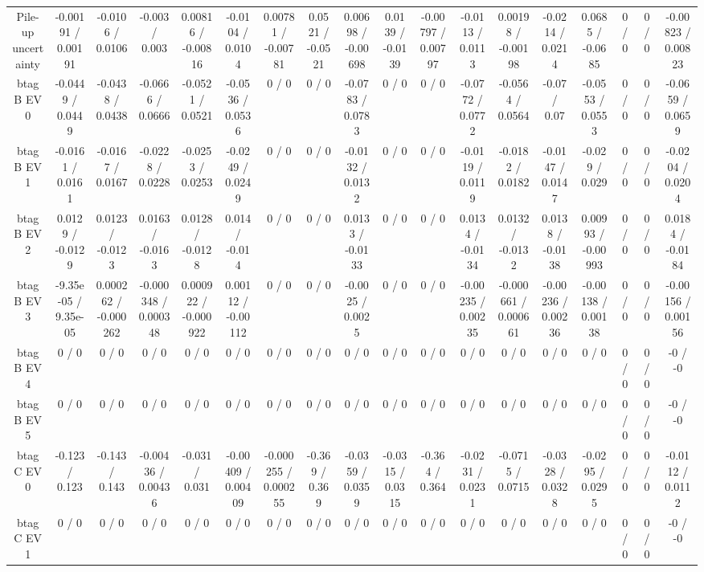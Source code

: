 \documentclass[10pt]{article}
\begin{document}
\begin{table}[htbp]
\begin{center}
\begin{tabular}{|c|c|c|c|c|c|c|c|c|c|c|c|c|c|c|c|c|c|}
  Pile-up uncertainty & -0.00191 / 0.00191 & -0.0106 / 0.0106 & -0.003 / 0.003 & 0.00816 / -0.00816 & -0.0104 / 0.0104 & 0.00781 / -0.00781 & 0.0521 / -0.0521 & 0.00698 / -0.00698 & 0.0139 / -0.0139 & -0.00797 / 0.00797 & -0.0113 / 0.0113 & 0.00198 / -0.00198 & -0.0214 / 0.0214 & 0.0685 / -0.0685 & 0 / 0 & 0 / 0 & -0.00823 / 0.00823 \\ 
  btag B EV 0 & -0.0449 / 0.0449 & -0.0438 / 0.0438 & -0.0666 / 0.0666 & -0.0521 / 0.0521 & -0.0536 / 0.0536 & 0 / 0 & 0 / 0 & -0.0783 / 0.0783 & 0 / 0 & 0 / 0 & -0.0772 / 0.0772 & -0.0564 / 0.0564 & -0.07 / 0.07 & -0.0553 / 0.0553 & 0 / 0 & 0 / 0 & -0.0659 / 0.0659 \\ 
  btag B EV 1 & -0.0161 / 0.0161 & -0.0167 / 0.0167 & -0.0228 / 0.0228 & -0.0253 / 0.0253 & -0.0249 / 0.0249 & 0 / 0 & 0 / 0 & -0.0132 / 0.0132 & 0 / 0 & 0 / 0 & -0.0119 / 0.0119 & -0.0182 / 0.0182 & -0.0147 / 0.0147 & -0.029 / 0.029 & 0 / 0 & 0 / 0 & -0.0204 / 0.0204 \\ 
  btag B EV 2 & 0.0129 / -0.0129 & 0.0123 / -0.0123 & 0.0163 / -0.0163 & 0.0128 / -0.0128 & 0.014 / -0.014 & 0 / 0 & 0 / 0 & 0.0133 / -0.0133 & 0 / 0 & 0 / 0 & 0.0134 / -0.0134 & 0.0132 / -0.0132 & 0.0138 / -0.0138 & 0.00993 / -0.00993 & 0 / 0 & 0 / 0 & 0.0184 / -0.0184 \\ 
  btag B EV 3 & -9.35e-05 / 9.35e-05 & 0.000262 / -0.000262 & -0.000348 / 0.000348 & 0.000922 / -0.000922 & 0.00112 / -0.00112 & 0 / 0 & 0 / 0 & -0.0025 / 0.0025 & 0 / 0 & 0 / 0 & -0.00235 / 0.00235 & -0.000661 / 0.000661 & -0.00236 / 0.00236 & -0.00138 / 0.00138 & 0 / 0 & 0 / 0 & -0.00156 / 0.00156 \\ 
  btag B EV 4 & 0 / 0 & 0 / 0 & 0 / 0 & 0 / 0 & 0 / 0 & 0 / 0 & 0 / 0 & 0 / 0 & 0 / 0 & 0 / 0 & 0 / 0 & 0 / 0 & 0 / 0 & 0 / 0 & 0 / 0 & 0 / 0 & -0 / -0 \\ 
  btag B EV 5 & 0 / 0 & 0 / 0 & 0 / 0 & 0 / 0 & 0 / 0 & 0 / 0 & 0 / 0 & 0 / 0 & 0 / 0 & 0 / 0 & 0 / 0 & 0 / 0 & 0 / 0 & 0 / 0 & 0 / 0 & 0 / 0 & -0 / -0 \\ 
  btag C EV 0 & -0.123 / 0.123 & -0.143 / 0.143 & -0.00436 / 0.00436 & -0.031 / 0.031 & -0.00409 / 0.00409 & -0.000255 / 0.000255 & -0.369 / 0.369 & -0.0359 / 0.0359 & -0.0315 / 0.0315 & -0.364 / 0.364 & -0.0231 / 0.0231 & -0.0715 / 0.0715 & -0.0328 / 0.0328 & -0.0295 / 0.0295 & 0 / 0 & 0 / 0 & -0.0112 / 0.0112 \\ 
  btag C EV 1 & 0 / 0 & 0 / 0 & 0 / 0 & 0 / 0 & 0 / 0 & 0 / 0 & 0 / 0 & 0 / 0 & 0 / 0 & 0 / 0 & 0 / 0 & 0 / 0 & 0 / 0 & 0 / 0 & 0 / 0 & 0 / 0 & -0 / -0 \\ 

\end{tabular}
\end{center}
\end{table}
\end{document}
